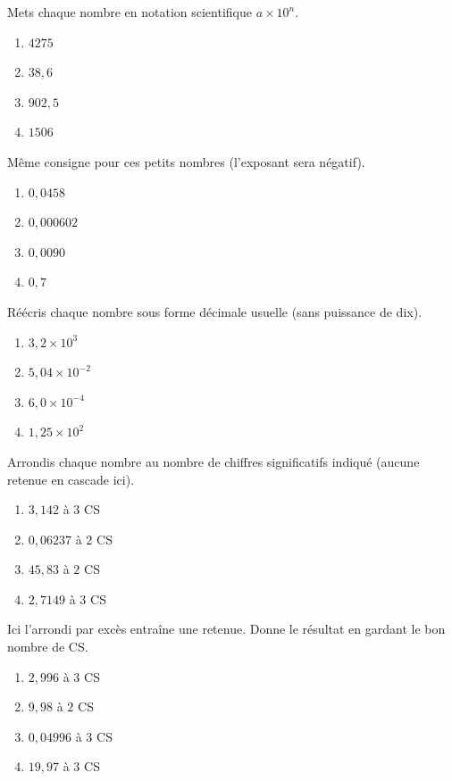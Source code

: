 \documentclass[11pt,a4paper]{article}
\begin{document}
\begin{exo}
Mets chaque nombre en notation scientifique $a\times10^{n}$.
\begin{enumerate}[label=\alph*)]
  \item $4275$
  \item $38,6$
  \item $902,5$
  \item $1506$
\end{enumerate}
\end{exo}

\begin{exo}
Même consigne pour ces petits nombres (l'exposant sera négatif).
\begin{enumerate}[label=\alph*)]
  \item $0,0458$
  \item $0,000602$
  \item $0,0090$
  \item $0,7$
\end{enumerate}
\end{exo}

\begin{exo}
Réécris chaque nombre sous forme décimale usuelle (sans puissance de dix).
\begin{enumerate}[label=\alph*)]
  \item $3,2\times10^{3}$
  \item $5,04\times10^{-2}$
  \item $6,0\times10^{-4}$
  \item $1,25\times10^{2}$
\end{enumerate}
\end{exo}

\begin{exo}
Arrondis chaque nombre au nombre de chiffres significatifs indiqué (aucune retenue en cascade ici).
\begin{enumerate}[label=\alph*)]
  \item $3,142$ à $3$ CS
  \item $0,06237$ à $2$ CS
  \item $45,83$ à $2$ CS
  \item $2,7149$ à $3$ CS
\end{enumerate}
\end{exo}

\begin{exo}
Ici l'arrondi par excès entraîne une retenue. Donne le résultat en gardant le bon nombre de CS.
\begin{enumerate}[label=\alph*)]
  \item $2,996$ à $3$ CS
  \item $9,98$ à $2$ CS
  \item $0,04996$ à $3$ CS
  \item $19,97$ à $3$ CS
\end{enumerate}
\end{exo}
\end{document}
